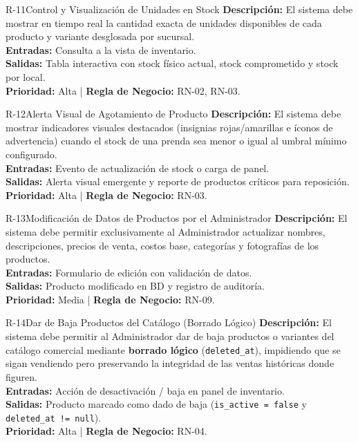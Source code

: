 \begin{reqbox}{R-11}{Control y Visualización de Unidades en Stock}
\textbf{Descripción:} El sistema debe mostrar en tiempo real la cantidad exacta de unidades disponibles de cada producto y variante desglosada por sucursal.\\
\textbf{Entradas:} Consulta a la vista de inventario.\\
\textbf{Salidas:} Tabla interactiva con stock físico actual, stock comprometido y stock por local.\\
\textbf{Prioridad:} Alta | \textbf{Regla de Negocio:} RN-02, RN-03.
\end{reqbox}

\begin{reqbox}{R-12}{Alerta Visual de Agotamiento de Producto}
\textbf{Descripción:} El sistema debe mostrar indicadores visuales destacados (insignias rojas/amarillas e íconos de advertencia) cuando el stock de una prenda sea menor o igual al umbral mínimo configurado.\\
\textbf{Entradas:} Evento de actualización de stock o carga de panel.\\
\textbf{Salidas:} Alerta visual emergente y reporte de productos críticos para reposición.\\
\textbf{Prioridad:} Alta | \textbf{Regla de Negocio:} RN-03.
\end{reqbox}

\begin{reqbox}{R-13}{Modificación de Datos de Productos por el Administrador}
\textbf{Descripción:} El sistema debe permitir exclusivamente al Administrador actualizar nombres, descripciones, precios de venta, costos base, categorías y fotografías de los productos.\\
\textbf{Entradas:} Formulario de edición con validación de datos.\\
\textbf{Salidas:} Producto modificado en BD y registro de auditoría.\\
\textbf{Prioridad:} Media | \textbf{Regla de Negocio:} RN-09.
\end{reqbox}

\begin{reqbox}{R-14}{Dar de Baja Productos del Catálogo (Borrado Lógico)}
\textbf{Descripción:} El sistema debe permitir al Administrador dar de baja productos o variantes del catálogo comercial mediante \textbf{borrado lógico} (\texttt{deleted\_at}), impidiendo que se sigan vendiendo pero preservando la integridad de las ventas históricas donde figuren.\\
\textbf{Entradas:} Acción de desactivación / baja en panel de inventario.\\
\textbf{Salidas:} Producto marcado como dado de baja (\texttt{is\_active = false} y \texttt{deleted\_at != null}).\\
\textbf{Prioridad:} Alta | \textbf{Regla de Negocio:} RN-04.
\end{reqbox}

